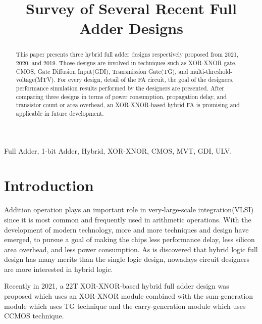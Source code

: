 \documentclass[conference]{IEEEtran}
\begin{document}
\title{Survey of Several Recent Full Adder Designs}

\author{
}
\maketitle

\begin{abstract}
	This paper presents three hybrid full adder designs respectively proposed from 2021, 2020, and 2019.
	Those designs are involved in techniques such as XOR-XNOR gate, CMOS, Gate Diffusion Input(GDI), Transmission Gate(TG), and multi-threshold-voltage(MTV).
	For every design, detail of the FA circuit, the goal of the designers, performance simulation results performed by the designers are presented.
	After comparing three designs in terms of power consumption, propagation delay, and transistor count or area overhead,
	an XOR-XNOR-based hybrid FA is promising and applicable in future development.
\end{abstract}

\begin{IEEEkeywords}
	Full Adder, 1-bit Adder, Hybrid, XOR-XNOR, CMOS, MVT, GDI, ULV.
\end{IEEEkeywords}

\section{Introduction}


Addition operation plays an important role in very-large-scale integration(VLSI) since it is most common and frequently used in arithmetic operations.
With the development of modern technology, more and more techniques and design have emerged,
to pursue a goal of making the chips less performance delay, less silicon area overhead, and less power consumption.
As is discovered that hybrid logic full design has many merits than the single logic design,
nowadays circuit designers are more interested in hybrid logic.

Recently in 2021, a 22T XOR-XNOR-based hybrid full adder design \cite{20212210429416} was proposed
which uses an XOR-XNOR module combined with the sum-generation module which uses TG technique
and the carry-generation module which uses CCMOS technique.
\end{document}
